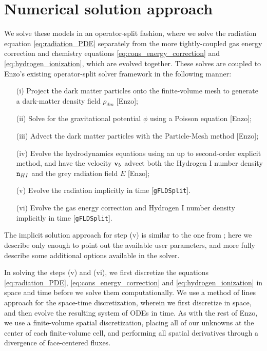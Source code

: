 \documentclass[letterpaper,10pt]{article}
\renewcommand{\(}{\left(}
\renewcommand{\)}{\right)}
\newcommand{\vb}{{\bf v}_b}
\newcommand{\mn}{{\tt n}}
\begin{document}
\section{Numerical solution approach}
\label{sec:solution_approach}

We solve these models in an operator-split fashion, where we solve
the radiation equation \eqref{eq:radiation_PDE} separately from the
more tightly-coupled gas energy correction and chemistry equations
\eqref{eq:cons_energy_correction} and \eqref{eq:hydrogen_ionization},
which are evolved together.  These solves are coupled to Enzo's
existing operator-split solver framework in the following manner:
\begin{itemize}
\item[(i)] Project the dark matter particles onto the finite-volume
  mesh to generate a dark-matter density field $\rho_{dm}$ [Enzo];
\item[(ii)] Solve for the gravitational potential $\phi$ using a
  Poisson equation [Enzo];
\item[(iii)] Advect the dark matter particles with the Particle-Mesh
  method [Enzo];
\item[(iv)] Evolve the hydrodynamics equations using an up to
  second-order explicit method, and have the velocity $\vb$ advect
  both the Hydrogen I number density $\mn_{HI}$ and the grey radiation
  field $E$ [Enzo]; 
\item[(v)] Evolve the radiation implicitly in time [{\tt gFLDSplit}].
\item[(vi)] Evolve the gas energy correction and Hydrogen I number
  density implicitly in time [{\tt gFLDSplit}]. 
\end{itemize}

The implicit solution approach for step (v) is similar to the one from 
\cite{ReynoldsHayesPaschosNorman2009}; here we describe only enough
to point out the available user parameters, and more fully describe
some additional options available in the solver.

In solving the steps (v) and (vi), we first discretize the
equations \eqref{eq:radiation_PDE}, \eqref{eq:cons_energy_correction}
and \eqref{eq:hydrogen_ionization} in space and time before we solve
them computationally.  We use a method of lines approach for the
space-time discretization, wherein we first discretize in space, and
then evolve the resulting system of ODEs in time.  As with the rest of
Enzo, we use a finite-volume spatial discretization, placing all of
our unknowns at the center of each finite-volume cell, and performing
all spatial derivatives through a divergence of face-centered fluxes.
\end{document}
